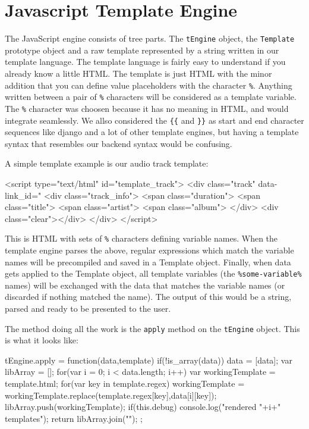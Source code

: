\section{Javascript Template Engine}

The JavaScript engine consists of tree parts. The 
\lstinline$tEngine$ object, the \lstinline$Template$ prototype object 
and a raw template represented by a string written in our template language. 
The template language is fairly easy to understand if you already know a little HTML. 
The template is just HTML with the minor addition that you can define value placeholders with the character \verb$%$. 
Anything written between a pair of \verb$%$ characters will be considered as a template variable. 
The \verb$%$ character was choosen because it has no meaning in HTML, and would integrate seamlessly. 
We allso considered the \verb${{$ and \verb$}}$ as start and end character 
sequences like django and a lot of other template engines, 
but having a template syntax that resembles our backend syntax would be confusing.

A simple template example is our audio track template:

\begin{snippet}[language=HTML,caption=The template used to represent audio tracks]
<script type="text/html" id="template_track">
	<div class="track" data-link_id="%
		<div class="track_info">
			<span class="duration">%
			<span class="title">%
			<span class="artist">%
			<span class="album">%
		</div>
		<div class="clear"></div>
	</div>
</script>
\end{snippet}
 
This is HTML with sets of \verb$%$ characters defining variable names. 
When the template engine parses the above, regular expressions which match the variable names will be precompiled and saved in a Template object. 
Finally, when data gets applied to the Template object, 
all template variables (the \verb$%some-variable%$ names) will be exchanged with 
the data that matches the variable names (or discarded if nothing matched the name).
The output of this would be a string, parsed and ready to be presented to the user.

The method doing all the work is the \verb$apply$ method on the \verb$tEngine$ object. This is what it looks like:
\begin{snippet}[language=JavaScript,caption=The javascript engine apply method]
tEngine.apply = function(data,template) {
    if(!is_array(data)) {
        data = [data];
    }
    var libArray = [];
    for(var i = 0; i < data.length; i++) {
        var workingTemplate = template.html;
        for(var key in template.regex) {
            workingTemplate = workingTemplate.replace(template.regex[key],data[i][key]);
        }
        libArray.push(workingTemplate);
    }
	if(this.debug) {
		console.log("rendered "+i+" templates");
	}
    return libArray.join("\n");
};
\end{snippet}


